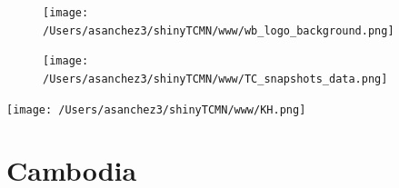 \documentclass{article}\usepackage[]{graphicx}\usepackage[]{color}
\begin{document}
%

\begin{figure}
  \vspace{-3ex} %
  \hspace{-7ex} %
  \texttt{[image: /Users/asanchez3/shinyTCMN/www/wb\_logo\_background.png]}
\end{figure}
\begin{figure}
  \begin{minipage}[t]{0.99\textwidth} %
      \vspace{-30ex}
      \hspace{-2ex}
      \raggedright{\texttt{[image: /Users/asanchez3/shinyTCMN/www/TC\_snapshots\_data.png]}}
  \end{minipage}
\end{figure}
%
\begin{minipage}[t]{0.99\textwidth} %
  \vspace{-1.5cm}
  \begin{minipage}[c]{0.36\textwidth} 
    \begin{minipage}[c]{0.28\textwidth} %
      \texttt{[image: /Users/asanchez3/shinyTCMN/www/KH.png]}
    \end{minipage}
    \begin{minipage}[c]{0.70\textwidth} %
      \section*{\color{blue!40!black}Cambodia}
    \end{minipage}
  \end{minipage}
  \begin{minipage}[c]{0.63\textwidth} %
    \centering
  \end{minipage}  
\end{minipage} %
\end{document}
